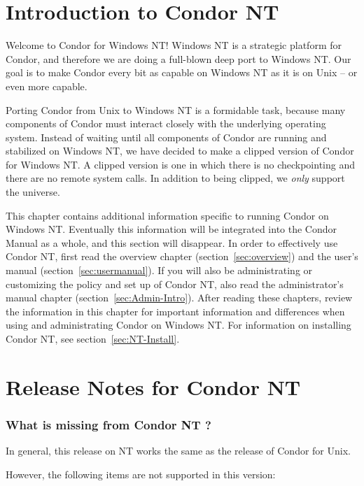 \section{Introduction to Condor NT \VersionNotice}
Welcome to Condor for Windows NT!  
Windows NT is a strategic platform for Condor,
and therefore we are
doing a full-blown deep port to Windows NT.
Our goal is to make Condor every bit as capable on Windows NT as it is on
Unix -- or even more capable.  

Porting Condor from Unix to Windows NT is a formidable task,
because many
components of Condor must interact closely with the underlying operating
system.
Instead of waiting until all components of Condor are running
and stabilized on Windows NT,
we have decided to make a clipped version of Condor for Windows
NT. A clipped version is one in which there is no checkpointing
and there are no remote system calls.
In addition to being clipped, we \emph{only} support the
 universe.

This chapter contains additional information specific to running
Condor on Windows NT.  Eventually this information will be integrated
into the Condor Manual as a whole, and this section will disappear.
In order to effectively use Condor NT, first read the overview
chapter (section~\ref{sec:overview})
and the user's manual (section~\ref{sec:usermanual}).
If you will
also be administrating or customizing the policy and set up of Condor NT,
also read the administrator's manual 
chapter (section~\ref{sec:Admin-Intro}).
After reading these chapters,
review the information in this chapter for
important information and differences when using and administrating
Condor on Windows NT.
For information on installing Condor NT, see
section~\ref{sec:NT-Install}.


\section{Release Notes for Condor NT \VersionNotice}

\subsubsection{What is missing from Condor NT \VersionNotice?}

In general, this release on NT works the same as the 
release of Condor for Unix.  

However, the following items are not supported in this version:

